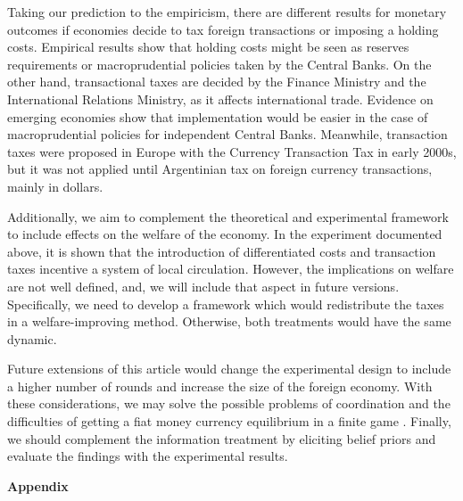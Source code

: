 Taking our prediction to the empiricism, there are different results for monetary outcomes if economies decide to tax foreign transactions or imposing a holding costs. Empirical results show that holding costs might be seen as reserves requirements or macroprudential policies taken by the Central Banks. On the other hand, transactional taxes are decided by the Finance Ministry and the International Relations Ministry, as it affects international trade. Evidence on emerging economies show that implementation would be easier in the case of macroprudential policies for independent Central Banks. Meanwhile, transaction taxes were proposed in Europe with the Currency Transaction Tax in early 2000s, but it was not applied until Argentinian tax on foreign currency transactions, mainly in dollars. 

Additionally, we aim to complement the theoretical and experimental framework to include effects on the welfare of the economy. In the experiment documented above, it is shown that the introduction of differentiated costs and transaction taxes incentive a system of local circulation. However, the implications on welfare are not well defined, and, we will include that aspect in future versions. Specifically, we need to develop a framework which would redistribute the taxes in a welfare-improving method. Otherwise, both treatments would have the same dynamic.

Future extensions of this article would change the experimental design to include a higher number of rounds and increase the size of the foreign economy. With these considerations, we may solve the possible problems of coordination and the difficulties of getting a fiat money currency equilibrium in a finite game \citep{10.1257/jel.20160980, RePEc:fip:fedrwp:19-02}. Finally, we should complement the information treatment by eliciting belief priors and evaluate the findings with the experimental results.








\newpage
\appendix

\begin{center}
\huge{\textbf{Appendix}}
\end{center}

